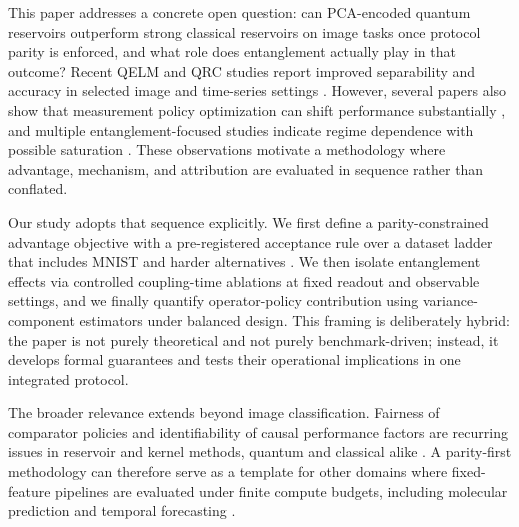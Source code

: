 \documentclass{article} %
\begin{document}
This paper addresses a concrete open question: can PCA-encoded quantum reservoirs outperform strong classical reservoirs on image tasks once protocol parity is enforced, and what role does entanglement actually play in that outcome? Recent QELM and QRC studies report improved separability and accuracy in selected image and time-series settings \citep{delorenzis2024qelm,delorenzis2025entanglement,prieto2026superconducting,antoncich2026neutral,liu2026rydberg}. However, several papers also show that measurement policy optimization can shift performance substantially \citep{gross2026kernelop,aaraba2026quark,gross2026paulitransfer}, and multiple entanglement-focused studies indicate regime dependence with possible saturation \citep{delorenzis2025entanglement,askari2025spin,karimi2025kerr}. These observations motivate a methodology where advantage, mechanism, and attribution are evaluated in sequence rather than conflated.

Our study adopts that sequence explicitly. We first define a parity-constrained advantage objective with a pre-registered acceptance rule over a dataset ladder that includes MNIST and harder alternatives \citep{lecun1998mnist,xiao2017fashionmnist,cohen2017emnist,clanuwat2018kuzushiji,krizhevsky2009cifar}. We then isolate entanglement effects via controlled coupling-time ablations at fixed readout and observable settings, and we finally quantify operator-policy contribution using variance-component estimators under balanced design. This framing is deliberately hybrid: the paper is not purely theoretical and not purely benchmark-driven; instead, it develops formal guarantees and tests their operational implications in one integrated protocol.

The broader relevance extends beyond image classification. Fairness of comparator policies and identifiability of causal performance factors are recurring issues in reservoir and kernel methods, quantum and classical alike \citep{schuld2021kernel,gross2026kernelop,lukosevicius2009}. A parity-first methodology can therefore serve as a template for other domains where fixed-feature pipelines are evaluated under finite compute budgets, including molecular prediction and temporal forecasting \citep{beaulieu2024robust,ahmed2025chaotic,hamhoum2025mts,dibartolo2025multiphoton,kodali2025narma}.
\end{document}
